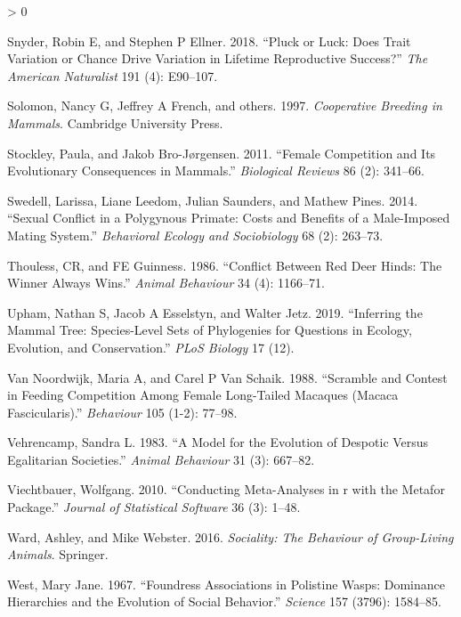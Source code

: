 \documentclass[
]{article}
\newlength{\cslhangindent}
\newenvironment{CSLReferences}[2] %
 {%
  \setlength{\parindent}{0pt}
  \ifodd #1 \everypar{\setlength{\hangindent}{\cslhangindent}}\ignorespaces\fi
  \ifnum #2 > 0
  \setlength{\parskip}{#2\baselineskip}
  \fi
 }%
 {}
\begin{document}
\begin{CSLReferences}{1}{0}
\leavevmode\hypertarget{ref-snyder2018pluck}{}%
Snyder, Robin E, and Stephen P Ellner. 2018. {``Pluck or Luck: Does
Trait Variation or Chance Drive Variation in Lifetime Reproductive
Success?''} \emph{The American Naturalist} 191 (4): E90--107.

\leavevmode\hypertarget{ref-solomon1997cooperative}{}%
Solomon, Nancy G, Jeffrey A French, and others. 1997. \emph{Cooperative
Breeding in Mammals}. Cambridge University Press.

\leavevmode\hypertarget{ref-stockley2011female}{}%
Stockley, Paula, and Jakob Bro-Jørgensen. 2011. {``Female Competition
and Its Evolutionary Consequences in Mammals.''} \emph{Biological
Reviews} 86 (2): 341--66.

\leavevmode\hypertarget{ref-swedell2014sexual}{}%
Swedell, Larissa, Liane Leedom, Julian Saunders, and Mathew Pines. 2014.
{``Sexual Conflict in a Polygynous Primate: Costs and Benefits of a
Male-Imposed Mating System.''} \emph{Behavioral Ecology and
Sociobiology} 68 (2): 263--73.

\leavevmode\hypertarget{ref-thouless1986conflict}{}%
Thouless, CR, and FE Guinness. 1986. {``Conflict Between Red Deer Hinds:
The Winner Always Wins.''} \emph{Animal Behaviour} 34 (4): 1166--71.

\leavevmode\hypertarget{ref-upham2019inferring}{}%
Upham, Nathan S, Jacob A Esselstyn, and Walter Jetz. 2019. {``Inferring
the Mammal Tree: Species-Level Sets of Phylogenies for Questions in
Ecology, Evolution, and Conservation.''} \emph{PLoS Biology} 17 (12).

\leavevmode\hypertarget{ref-van1988scramble}{}%
Van Noordwijk, Maria A, and Carel P Van Schaik. 1988. {``Scramble and
Contest in Feeding Competition Among Female Long-Tailed Macaques (Macaca
Fascicularis).''} \emph{Behaviour} 105 (1-2): 77--98.

\leavevmode\hypertarget{ref-vehrencamp1983model}{}%
Vehrencamp, Sandra L. 1983. {``A Model for the Evolution of Despotic
Versus Egalitarian Societies.''} \emph{Animal Behaviour} 31 (3):
667--82.

\leavevmode\hypertarget{ref-viechtbauer2010conducting}{}%
Viechtbauer, Wolfgang. 2010. {``Conducting Meta-Analyses in r with the
Metafor Package.''} \emph{Journal of Statistical Software} 36 (3):
1--48.

\leavevmode\hypertarget{ref-ward2016sociality}{}%
Ward, Ashley, and Mike Webster. 2016. \emph{Sociality: The Behaviour of
Group-Living Animals}. Springer.

\leavevmode\hypertarget{ref-west1967foundress}{}%
West, Mary Jane. 1967. {``Foundress Associations in Polistine Wasps:
Dominance Hierarchies and the Evolution of Social Behavior.''}
\emph{Science} 157 (3796): 1584--85.


\end{CSLReferences}
\end{document}
